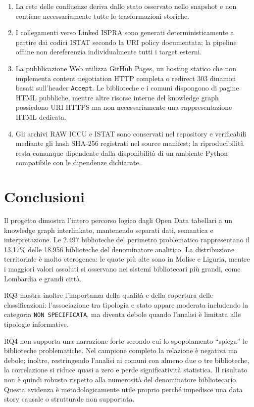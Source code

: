 \documentclass[11pt,a4paper]{article}
\begin{document}
\begin{enumerate}
\item La rete delle confluenze deriva dallo stato osservato nello snapshot e non contiene necessariamente tutte le trasformazioni storiche.
\item I collegamenti verso Linked ISPRA sono generati deterministicamente a partire dai codici ISTAT secondo la URI policy documentata; la pipeline offline non dereferenzia individualmente tutti i target esterni.
\item La pubblicazione Web utilizza GitHub Pages, un hosting statico che non implementa content negotiation HTTP completa o redirect 303 dinamici basati sull'header \texttt{Accept}. Le biblioteche e i comuni dispongono di pagine HTML pubbliche, mentre altre risorse interne del knowledge graph possiedono URI HTTPS ma non necessariamente una rappresentazione HTML dedicata.
\item Gli archivi RAW ICCU e ISTAT sono conservati nel repository e verificabili mediante gli hash SHA-256 registrati nel source manifest; la riproducibilità resta comunque dipendente dalla disponibilità di un ambiente Python compatibile con le dipendenze dichiarate.
\end{enumerate}

\section{Conclusioni}
Il progetto dimostra l'intero percorso logico dagli Open Data tabellari a un knowledge graph interlinkato, mantenendo separati dati, semantica e interpretazione. Le 2.497 biblioteche del perimetro problematico rappresentano il 13,17\% delle 18.956 biblioteche del denominatore analitico. La distribuzione territoriale è molto eterogenea: le quote più alte sono in Molise e Liguria, mentre i maggiori valori assoluti si osservano nei sistemi bibliotecari più grandi, come Lombardia e grandi città.

RQ3 mostra inoltre l'importanza della qualità e della copertura delle classificazioni: l'associazione tra tipologia e stato appare moderata includendo la categoria \texttt{NON SPECIFICATA}, ma diventa debole quando l'analisi è limitata alle tipologie informative.

RQ4 non supporta una narrazione forte secondo cui lo spopolamento ``spiega'' le biblioteche problematiche. Nel campione completo la relazione è negativa ma debole; inoltre, restringendo l'analisi ai comuni con almeno due o tre biblioteche, la correlazione si riduce quasi a zero e perde significatività statistica. Il risultato non è quindi robusto rispetto alla numerosità del denominatore bibliotecario. Questa evidenza è metodologicamente utile proprio perché impedisce una data story causale o strutturale non supportata.
\end{document}
